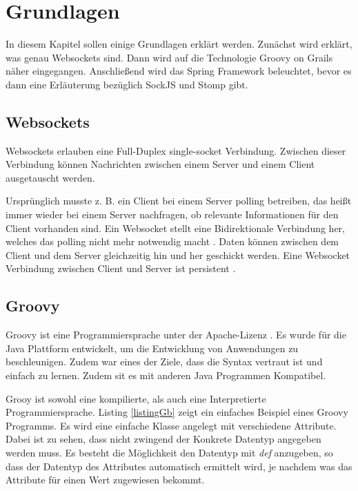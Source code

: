
\section{Grundlagen}

In diesem Kapitel sollen einige Grundlagen erklärt werden. Zunächst wird erklärt, was genau Websockets sind. Dann wird auf die Technologie Groovy on Grails näher eingegangen. Anschließend wird das Spring Framework beleuchtet, bevor es dann eine Erläuterung bezüglich SockJS und Stomp gibt.

\subsection{Websockets}\label{websocket}

Websockets erlauben eine Full-Duplex single-socket Verbindung. Zwischen dieser Verbindung können Nachrichten zwischen einem Server und einem Client ausgetauscht werden. 

Ursprünglich musste z. B. ein Client bei einem Server polling betreiben, das heißt immer wieder bei einem Server nachfragen, ob relevante Informationen für den Client vorhanden sind. Ein Websocket stellt eine Bidirektionale Verbindung her, welches das polling nicht mehr notwendig macht \cite[Seite 751f]{iuliana2017}. Daten können zwischen dem Client und dem Server gleichzeitig hin und her geschickt werden. Eine Websocket Verbindung zwischen Client und Server ist persistent \cite{malte2017}. 

\subsection{Groovy}

Groovy ist eine Programmiersprache unter der Apache-Lizenz \cite{groovy2017}.
Es wurde für die Java Plattform entwickelt, um die Entwicklung von Anwendungen zu beschleunigen. Zudem war eines der Ziele, dass die Syntax vertraut ist und einfach zu lernen. Zudem sit es mit anderen Java Programmen Kompatibel. 

Grooy ist sowohl eine kompilierte, als auch eine Interpretierte Programmiersprache. 
Listing \ref{listingGb} zeigt ein einfaches Beispiel eines Groovy Programms. Es wird eine einfache Klasse angelegt mit verschiedene Attribute. Dabei ist zu sehen, dass nicht zwingend der Konkrete Datentyp angegeben werden muss. Es besteht die Möglichkeit den Datentyp mit \textit{def} anzugeben, so dass der Datentyp des Attributes automatisch ermittelt wird, je nachdem was das Attribute für einen Wert zugewiesen bekommt. 

